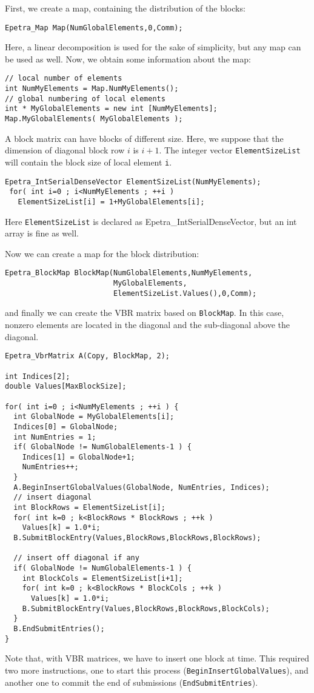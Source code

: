 First, we create a map, containing the distribution of the blocks:
\begin{verbatim}
Epetra_Map Map(NumGlobalElements,0,Comm);
\end{verbatim}
Here, a linear decomposition is used for the sake of simplicity, but any
map can be used as well.
Now, we obtain some information about the map:
\begin{verbatim}
// local number of elements
int NumMyElements = Map.NumMyElements();
// global numbering of local elements
int * MyGlobalElements = new int [NumMyElements];
Map.MyGlobalElements( MyGlobalElements );
\end{verbatim}
A block matrix can have blocks of different size.  Here, we suppose that
the dimension of diagonal block row $i$ is $i+1$.  The integer vector
\verb!ElementSizeList! will contain the block size of local element
\verb!i!.
\begin{verbatim}
Epetra_IntSerialDenseVector ElementSizeList(NumMyElements);
 for( int i=0 ; i<NumMyElements ; ++i ) 
   ElementSizeList[i] = 1+MyGlobalElements[i];
\end{verbatim}
Here \verb!ElementSizeList! is declared as Epetra\_IntSerialDenseVector,
but an int array is fine as well.

Now we can create a map for the block distribution:
\begin{verbatim}
Epetra_BlockMap BlockMap(NumGlobalElements,NumMyElements,
                         MyGlobalElements, 
                         ElementSizeList.Values(),0,Comm);
\end{verbatim}
and finally we can create the VBR matrix based on \verb!BlockMap!. In
this case, nonzero elements are located in the diagonal and the
sub-diagonal above the diagonal.
\begin{verbatim}
Epetra_VbrMatrix A(Copy, BlockMap, 2);

int Indices[2];
double Values[MaxBlockSize];

for( int i=0 ; i<NumMyElements ; ++i ) {
  int GlobalNode = MyGlobalElements[i];
  Indices[0] = GlobalNode;
  int NumEntries = 1;
  if( GlobalNode != NumGlobalElements-1 ) {
    Indices[1] = GlobalNode+1;
    NumEntries++;
  }
  A.BeginInsertGlobalValues(GlobalNode, NumEntries, Indices);
  // insert diagonal
  int BlockRows = ElementSizeList[i];
  for( int k=0 ; k<BlockRows * BlockRows ; ++k )
    Values[k] = 1.0*i;
  B.SubmitBlockEntry(Values,BlockRows,BlockRows,BlockRows);

  // insert off diagonal if any
  if( GlobalNode != NumGlobalElements-1 ) {
    int BlockCols = ElementSizeList[i+1];
    for( int k=0 ; k<BlockRows * BlockCols ; ++k )
      Values[k] = 1.0*i;
    B.SubmitBlockEntry(Values,BlockRows,BlockRows,BlockCols);
  }
  B.EndSubmitEntries();
}
\end{verbatim}
Note that, with VBR matrices, we have to insert one block at time.  This
required two more instructions, one to start this process
(\verb!BeginInsertGlobalValues!), and another one to commit the end of
submissions (\verb!EndSubmitEntries!).
 
